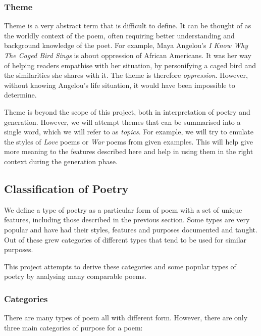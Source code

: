 \subsubsection{Theme}
Theme is a very abstract term that is difficult to define. It can be thought of as the worldly context of the poem, often requiring better understanding and background knowledge of the poet. For example, Maya Angelou's \textit{I Know Why The Caged Bird Sings} is about oppression of African Americans. It was her way of helping readers empathise with her situation, by personifying a caged bird and the similarities she shares with it. The theme is therefore \textit{oppression}. However, without knowing Angelou's life situation, it would have been impossible to determine.

Theme is beyond the scope of this project, both in interpretation of poetry and generation. However, we will attempt themes that can be summarised into a single word, which we will refer to as \textit{topics}. For example, we will try to emulate the styles of \textit{Love} poems or \textit{War} poems from given examples. This will help give more meaning to the features described here and help in using them in the right context during the generation phase.

\subsection{Classification of Poetry}

We define a type of poetry as a particular form of poem with a set of unique features, including those described in the previous section. Some types are very popular and have had their styles, features and purposes documented and taught. Out of these grew categories of different types that tend to be used for similar purposes.

This project attempts to derive these categories and some popular types of poetry by analysing many comparable poems.

\subsubsection{Categories}

There are many types of poem all with different form. However, there are only three main categories of purpose for a poem:

